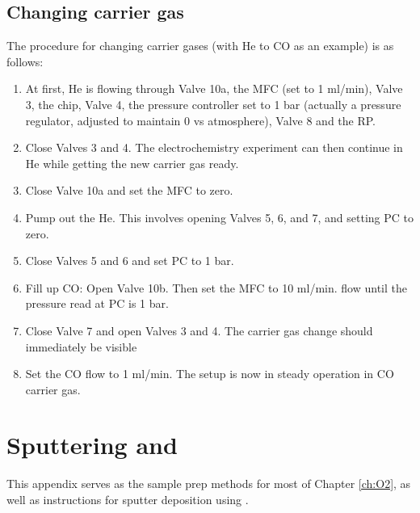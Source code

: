 \subsection{Changing carrier gas}
The procedure for changing carrier gases (with He to CO as an example) is as follows:
\begin{enumerate}
	\item At first, He is flowing through Valve 10a, the MFC (set to 1 ml/min), Valve 3, the chip, Valve 4, the pressure controller set to 1 bar (actually a pressure regulator, adjusted to maintain 0 vs atmosphere), Valve 8 and the RP. 
	
	\item Close Valves 3 and 4. The electrochemistry experiment can then continue in He while getting the new carrier gas ready.
	
	\item Close Valve 10a and set the MFC to zero.
	
	\item Pump out the He. This involves opening Valves 5, 6, and 7, and setting PC to zero.
	
	\item Close Valves 5 and 6 and set PC to 1 bar.
	
	\item Fill up CO: Open Valve 10b. Then set the MFC to 10 ml/min. flow until the pressure read at PC is 1 bar.
	
	\item Close Valve 7 and open Valves 3 and 4. The carrier gas change should immediately be visible 
	
	\item Set the CO flow to 1 ml/min. The setup is now in steady operation in CO carrier gas.
\end{enumerate}


\section{Sputtering  and }

This appendix serves as the sample prep methods for most of Chapter \ref{ch:O2}, as well as instructions for sputter deposition using .

